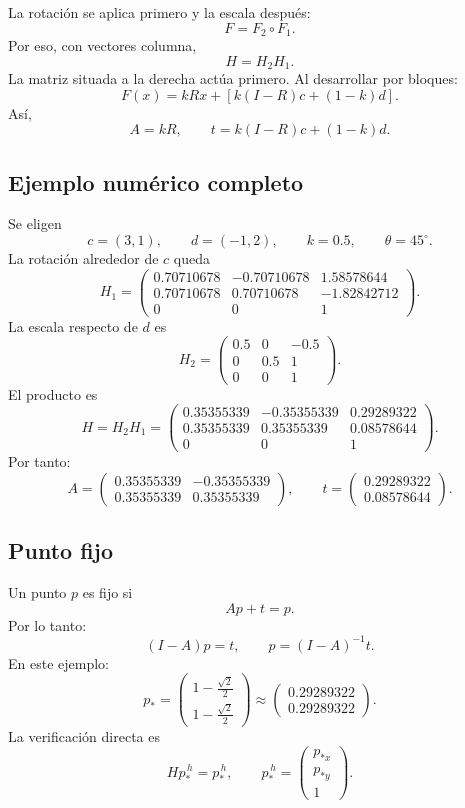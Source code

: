 La rotación se aplica primero y la escala después:
\[
F=F_2\circ F_1.
\]
Por eso, con vectores columna,
\[
\boxed{H=H_2H_1}.
\]
La matriz situada a la derecha actúa primero. Al desarrollar por bloques:
\[
F(x)=kRx+\left[k(I-R)c+(1-k)d\right].
\]
Así,
\[
A=kR,
\qquad
t=k(I-R)c+(1-k)d.
\]

\subsection{Ejemplo numérico completo}

Se eligen
\[
c=(3,1),\qquad d=(-1,2),\qquad
k=0.5,\qquad \theta=45^\circ.
\]
La rotación alrededor de \(c\) queda
\[
H_1=
\begin{pmatrix}
0.70710678&-0.70710678&1.58578644\\
0.70710678& 0.70710678&-1.82842712\\
0&0&1
\end{pmatrix}.
\]
La escala respecto de \(d\) es
\[
H_2=
\begin{pmatrix}
0.5&0&-0.5\\
0&0.5&1\\
0&0&1
\end{pmatrix}.
\]
El producto es
\[
\boxed{
H=H_2H_1=
\begin{pmatrix}
0.35355339&-0.35355339&0.29289322\\
0.35355339& 0.35355339&0.08578644\\
0&0&1
\end{pmatrix}
}.
\]
Por tanto:
\[
A=
\begin{pmatrix}
0.35355339&-0.35355339\\
0.35355339& 0.35355339
\end{pmatrix},
\qquad
t=
\begin{pmatrix}
0.29289322\\
0.08578644
\end{pmatrix}.
\]

\subsection{Punto fijo}

Un punto \(p\) es fijo si
\[
Ap+t=p.
\]
Por lo tanto:
\[
(I-A)p=t,
\qquad
\boxed{p=(I-A)^{-1}t}.
\]
En este ejemplo:
\[
\boxed{
p_\ast=
\begin{pmatrix}
1-\frac{\sqrt2}{2}\\[1mm]
1-\frac{\sqrt2}{2}
\end{pmatrix}
\approx
\begin{pmatrix}
0.29289322\\
0.29289322
\end{pmatrix}
}.
\]
La verificación directa es
\[
Hp_\ast^{\,h}=p_\ast^{\,h},
\qquad
p_\ast^{\,h}=
\begin{pmatrix}p_{\ast x}\\p_{\ast y}\\1\end{pmatrix}.
\]

